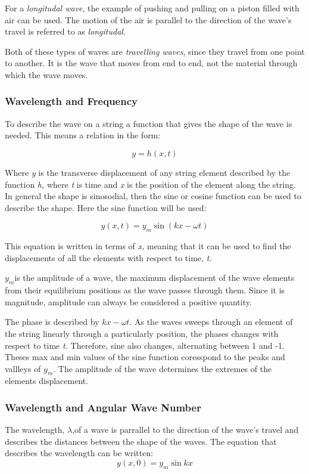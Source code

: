 \documentclass[english]{article}
\begin{document}
For a \emph{longitudal wave}, the example of pushing and pulling on
a piston filled with air can be used. The motion of the air is parallel
to the direction of the wave's travel is referred to as \emph{longitudal.}

Both of these types of waves are \emph{travelling waves}, since they
travel from one point to another. It is the wave that moves from end
to end, not the material through which the wave moves.


\subsubsection*{Wavelength and Frequency}

To describe the wave on a string a function that gives the shape of
the wave is needed. This means a relation in the form:

\[
y=h(x,t)
\]


Where \emph{y }is the transverse displacement of any string element
described by the function \emph{h, }where \emph{t }is time and \emph{x
}is the position of the element along the string. In general the shape
is sinosodial, then the sine or cosine function can be used to describe
the shape. Here the sine function will be used:

\[
y(x,t)=y_{m}\sin(kx-\omega t)
\]


This equation is written in terms of \emph{x,} meaning that it can
be used to find the displacements of all the elements with respect
to time, \emph{t. }

$y_{m}$is the amplitude of a wave, the maximum displacement of the
wave elements from their equilibrium positions as the wave passes
through them. Since it is magnitude, amplitude can always be considered
a positive quantity.

The phase is described by $kx-\omega t$. As the waves sweeps through
an element of the string linearly through a particularly position,
the phases changes with respect to time \emph{t. }Therefore, sine
also changes, alternating between 1 and -1. Theses max and min values
of the sine function coresspond to the peaks and vallleys of $y_{m}$.
The amplitude of the wave determines the extremes of the elements
displacement.


\subsubsection*{Wavelength and Angular Wave Number}

The wavelength, $\lambda$,of a wave is parrallel to the direction
of the wave's travel and describes the distances between the shape
of the waves. The equation that describes the wavelength can be written:
\[
y(x,0)=y_{m}\sin kx
\]
\end{document}
